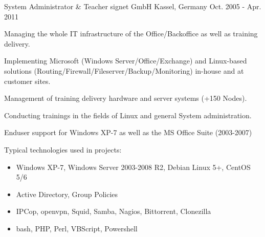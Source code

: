 \begin{cventries}
  \cventry
    {System Administrator \& Teacher} %
    {signet GmbH} %
    {Kassel, Germany} %
    {Oct. 2005 - Apr. 2011} %
    {
      \begin{cvitems} %
        \item Managing the whole IT infrastructure of the Office/Backoffice as well as training delivery.
        \item Implementing Microsoft (Windows Server/Office/Exchange) and Linux-based solutions (Routing/Firewall/Fileserver/Backup/Monitoring) in-house and at customer sites.
        \item Management of training delivery hardware and server systems (+150 Nodes).
        \item Conducting trainings in the fields of Linux and general System administration.
        \item Enduser support for Windows XP-7 as well as the MS Office Suite (2003-2007)
        \item Typical technologies used in projects:
          \begin{itemize}
            \item Windows XP-7, Windows Server 2003-2008 R2, Debian Linux 5+, CentOS 5/6
            \item Active Directory, Group Policies
            \item IPCop, openvpn, Squid, Samba, Nagios, Bittorrent, Clonezilla
            \item bash, PHP, Perl, VBScript, Powershell
          \end{itemize}
      \end{cvitems}
    }

\end{cventries}
